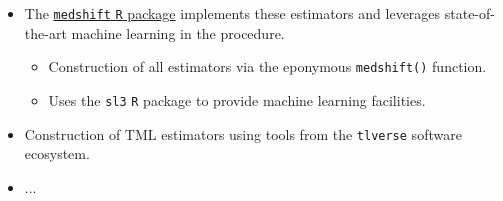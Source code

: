 \documentclass[landscape,a0paper,fontscale=0.285]{baposter} %
\newcommand{\compresslist}{ %
\setlength{\itemsep}{1pt}
\setlength{\parskip}{0pt}
\setlength{\parsep}{0pt}
}
\begin{document}
\begin{poster}
{\begin{itemize}\compresslist
  \setlength\itemsep{0.5em}
  \item The \underline{\texttt{medshift} \texttt{R} package}
    \cite{hejazi2019medshift} implements these estimators and leverages
    state-of-the-art machine learning in the procedure.
    \begin{itemize}
      \item Construction of all estimators via the eponymous \texttt{medshift()}
        function.
      \item Uses the \texttt{sl3} \texttt{R} package to provide machine learning
        facilities.
    \end{itemize}
  \item Construction of TML estimators using tools from the \texttt{tlverse}
    software ecosystem.
  \item ...
\end{itemize}
\vspace{0.1cm} %
}



\end{poster}
\end{document}
